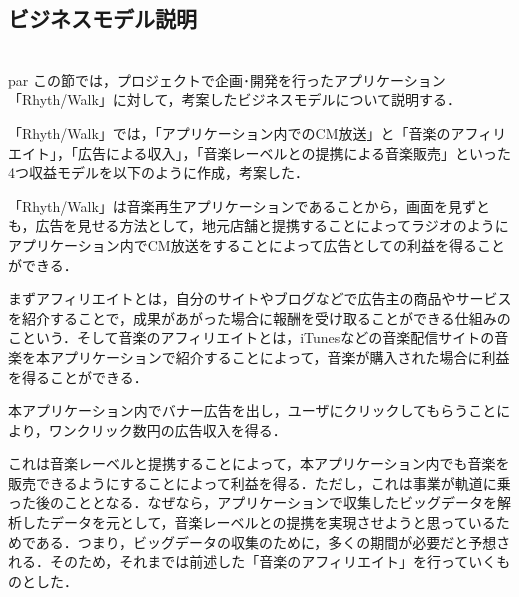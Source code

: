 \subsection{ビジネスモデル説明}
\\par
この節では，プロジェクトで企画･開発を行ったアプリケーション「Rhyth/Walk」に対して，考案したビジネスモデルについて説明する．
\par
「Rhyth/Walk」では，「アプリケーション内でのCM放送」と「音楽のアフィリエイト」，「広告による収入」，「音楽レーベルとの提携による音楽販売」といった4つ収益モデルを以下のように作成，考案した．
\par
\begin{itemize}
「Rhyth/Walk」は音楽再生アプリケーションであることから，画面を見ずとも，広告を見せる方法として，地元店舗と提携することによってラジオのようにアプリケーション内でCM放送をすることによって広告としての利益を得ることができる．
\par
{}
まずアフィリエイトとは，自分のサイトやブログなどで広告主の商品やサービスを紹介することで，成果があがった場合に報酬を受け取ることができる仕組みのこという．そして音楽のアフィリエイトとは，iTunesなどの音楽配信サイトの音楽を本アプリケーションで紹介することによって，音楽が購入された場合に利益を得ることができる．
\par
{}
本アプリケーション内でバナー広告を出し，ユーザにクリックしてもらうことにより，ワンクリック数円の広告収入を得る．
\par
{}
これは音楽レーベルと提携することによって，本アプリケーション内でも音楽を販売できるようにすることによって利益を得る．ただし，これは事業が軌道に乗った後のこととなる．なぜなら，アプリケーションで収集したビッグデータを解析したデータを元として，音楽レーベルとの提携を実現させようと思っているためである．つまり，ビッグデータの収集のために，多くの期間が必要だと予想される．そのため，それまでは前述した「音楽のアフィリエイト」を行っていくものとした．
\end{itemize}
